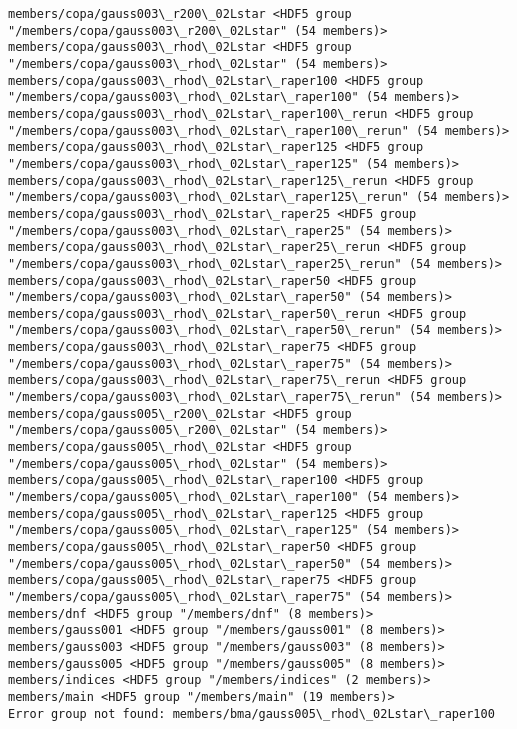 \documentclass[11pt]{article}
\begin{document}
\begin{Verbatim}[commandchars=\\\{\}]
members/copa/gauss003\_r200\_02Lstar <HDF5 group "/members/copa/gauss003\_r200\_02Lstar" (54 members)>
members/copa/gauss003\_rhod\_02Lstar <HDF5 group "/members/copa/gauss003\_rhod\_02Lstar" (54 members)>
members/copa/gauss003\_rhod\_02Lstar\_raper100 <HDF5 group "/members/copa/gauss003\_rhod\_02Lstar\_raper100" (54 members)>
members/copa/gauss003\_rhod\_02Lstar\_raper100\_rerun <HDF5 group "/members/copa/gauss003\_rhod\_02Lstar\_raper100\_rerun" (54 members)>
members/copa/gauss003\_rhod\_02Lstar\_raper125 <HDF5 group "/members/copa/gauss003\_rhod\_02Lstar\_raper125" (54 members)>
members/copa/gauss003\_rhod\_02Lstar\_raper125\_rerun <HDF5 group "/members/copa/gauss003\_rhod\_02Lstar\_raper125\_rerun" (54 members)>
members/copa/gauss003\_rhod\_02Lstar\_raper25 <HDF5 group "/members/copa/gauss003\_rhod\_02Lstar\_raper25" (54 members)>
members/copa/gauss003\_rhod\_02Lstar\_raper25\_rerun <HDF5 group "/members/copa/gauss003\_rhod\_02Lstar\_raper25\_rerun" (54 members)>
members/copa/gauss003\_rhod\_02Lstar\_raper50 <HDF5 group "/members/copa/gauss003\_rhod\_02Lstar\_raper50" (54 members)>
members/copa/gauss003\_rhod\_02Lstar\_raper50\_rerun <HDF5 group "/members/copa/gauss003\_rhod\_02Lstar\_raper50\_rerun" (54 members)>
members/copa/gauss003\_rhod\_02Lstar\_raper75 <HDF5 group "/members/copa/gauss003\_rhod\_02Lstar\_raper75" (54 members)>
members/copa/gauss003\_rhod\_02Lstar\_raper75\_rerun <HDF5 group "/members/copa/gauss003\_rhod\_02Lstar\_raper75\_rerun" (54 members)>
members/copa/gauss005\_r200\_02Lstar <HDF5 group "/members/copa/gauss005\_r200\_02Lstar" (54 members)>
members/copa/gauss005\_rhod\_02Lstar <HDF5 group "/members/copa/gauss005\_rhod\_02Lstar" (54 members)>
members/copa/gauss005\_rhod\_02Lstar\_raper100 <HDF5 group "/members/copa/gauss005\_rhod\_02Lstar\_raper100" (54 members)>
members/copa/gauss005\_rhod\_02Lstar\_raper125 <HDF5 group "/members/copa/gauss005\_rhod\_02Lstar\_raper125" (54 members)>
members/copa/gauss005\_rhod\_02Lstar\_raper50 <HDF5 group "/members/copa/gauss005\_rhod\_02Lstar\_raper50" (54 members)>
members/copa/gauss005\_rhod\_02Lstar\_raper75 <HDF5 group "/members/copa/gauss005\_rhod\_02Lstar\_raper75" (54 members)>
members/dnf <HDF5 group "/members/dnf" (8 members)>
members/gauss001 <HDF5 group "/members/gauss001" (8 members)>
members/gauss003 <HDF5 group "/members/gauss003" (8 members)>
members/gauss005 <HDF5 group "/members/gauss005" (8 members)>
members/indices <HDF5 group "/members/indices" (2 members)>
members/main <HDF5 group "/members/main" (19 members)>
Error group not found: members/bma/gauss005\_rhod\_02Lstar\_raper100

\end{Verbatim}
\end{document}
